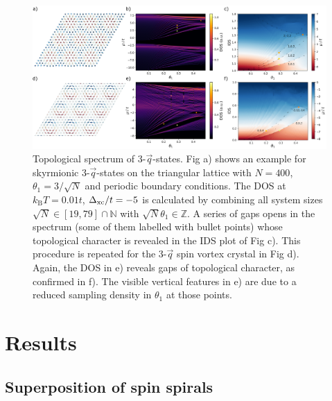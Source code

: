 \documentclass[
    10pt,
    aps,
    prb,
	longbibliography,
    twocolumn,
    floatfix,
    superscriptaddress,
]{revtex4-2}
\begin{document}
\begin{figure}[t]
 \centering
 \includegraphics[width=\linewidth]{../gfx/figure_02/figure_02.png}
 \caption{
     Topological spectrum of 3-$\vec{q}$-states.
     Fig a) shows an example for skyrmionic 3-$\vec{q}$-states on the triangular lattice with $N=400$, $\theta_1 = 3/\sqrt{N}$ and periodic boundary conditions.
     The DOS at $k_\mathrm{B}T = 0.01t$, $\Delta_\mathrm{xc} / t=-5$ is calculated by combining all system sizes $\sqrt{N} \in [19,79]\cap \mathbb{N}$ with  $\sqrt{N}\theta_1 \in \mathbb{Z}$.
     A series of gaps opens in the spectrum (some of them labelled with bullet points) whose topological character is revealed in the IDS plot of Fig c).
     This procedure is repeated for the 3-$\vec{q}$ spin vortex crystal in Fig d).
    Again, the DOS in e) reveals gaps of topological character, as confirmed in f).
    The visible vertical features in e) are due to a reduced sampling density in $\theta_1$ at those points. 
 }  
 \label{fig:three_q_states}
\end{figure}



\section{Results}
\subsection{Superposition of spin spirals}
\end{document}

